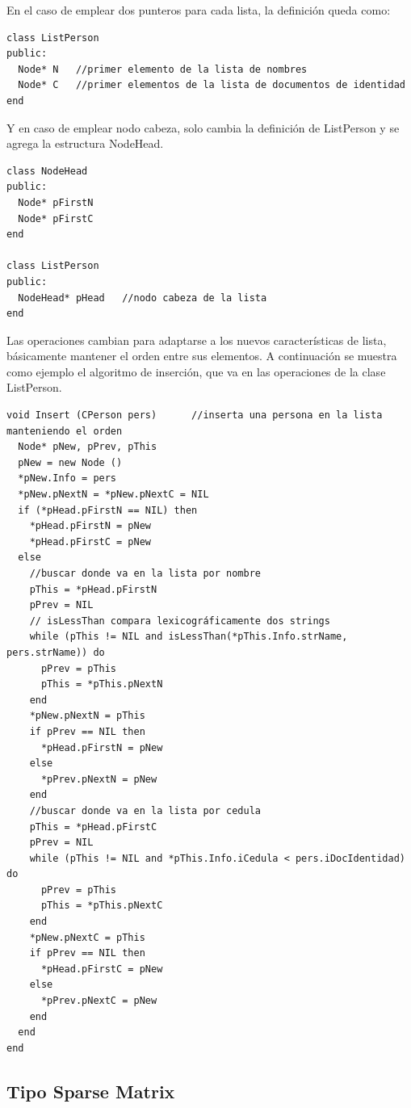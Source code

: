 En el caso de emplear dos punteros para cada lista, la definición queda como:

\begin{lstlisting}[upquote=true, language=pseudo]
class ListPerson
public:
  Node* N	//primer elemento de la lista de nombres
  Node* C	//primer elementos de la lista de documentos de identidad
end
\end{lstlisting}

Y en caso de emplear nodo cabeza, solo cambia la definición de ListPerson y se agrega la estructura NodeHead.

\begin{lstlisting}[upquote=true, language=pseudo]
class NodeHead
public:
  Node* pFirstN
  Node* pFirstC
end

class ListPerson
public:
  NodeHead* pHead	//nodo cabeza de la lista
end
\end{lstlisting}

Las operaciones cambian para adaptarse a los nuevos características de lista, básicamente mantener el orden entre sus elementos. A continuación se muestra como ejemplo el algoritmo de inserción, que va en las operaciones de la clase ListPerson.

\begin{lstlisting}[upquote=true, language=pseudo]
void Insert (CPerson pers)		//inserta una persona en la lista manteniendo el orden
  Node* pNew, pPrev, pThis
  pNew = new Node ()
  *pNew.Info = pers
  *pNew.pNextN = *pNew.pNextC = NIL
  if (*pHead.pFirstN == NIL) then
    *pHead.pFirstN = pNew
    *pHead.pFirstC = pNew
  else
    //buscar donde va en la lista por nombre
    pThis = *pHead.pFirstN
    pPrev = NIL
    // isLessThan compara lexicográficamente dos strings
    while (pThis != NIL and isLessThan(*pThis.Info.strName, pers.strName)) do
      pPrev = pThis
      pThis = *pThis.pNextN
    end
    *pNew.pNextN = pThis
    if pPrev == NIL then
      *pHead.pFirstN = pNew
    else
      *pPrev.pNextN = pNew
    end
    //buscar donde va en la lista por cedula
    pThis = *pHead.pFirstC
    pPrev = NIL
    while (pThis != NIL and *pThis.Info.iCedula < pers.iDocIdentidad) do
      pPrev = pThis
      pThis = *pThis.pNextC
    end
    *pNew.pNextC = pThis
    if pPrev == NIL then
      *pHead.pFirstC = pNew
    else
      *pPrev.pNextC = pNew
    end
  end
end
\end{lstlisting}
\subsection{Tipo Sparse Matrix} \label{sec:sparse}

